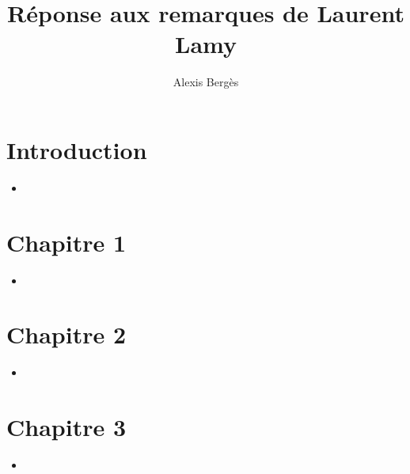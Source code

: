 \documentclass{article}
\begin{document}
\title{Réponse aux remarques de Laurent Lamy}
\author{Alexis Bergès}

\maketitle

\section{Introduction}
\begin{itemize}
\item
\begin{quote}

\end{quote}

\end{itemize}

\section{Chapitre 1}
\begin{itemize}
\item
\begin{quote}

\end{quote}
\end{itemize}

\section{Chapitre 2}
\begin{itemize}
\item
\begin{quote}

\end{quote}
\end{itemize}

\section{Chapitre 3}
\begin{itemize}
\item
\begin{quote}

\end{quote}
\end{itemize}

\end{document}
